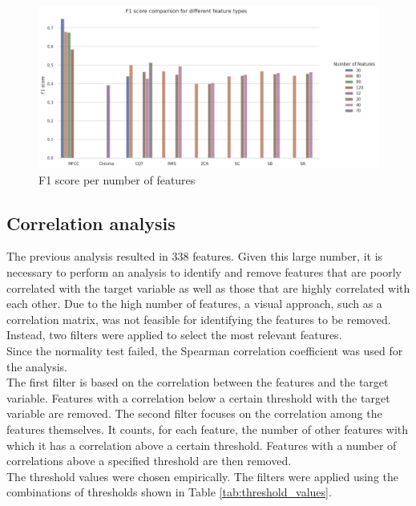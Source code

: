 \begin{figure}[htbp]
    \centering
    \includegraphics[width=.8\textwidth]{../images/n_feature_per_type.png}
    \caption{F1 score per number of features}
    \label{fig:n_feature_per_type}
\end{figure}
\noindent
\subsection{Correlation analysis}
The previous analysis resulted in 338 features. Given this large number, it is necessary to perform an analysis to identify and remove features
that are poorly correlated with the target variable as well as those that are highly correlated with each other.
Due to the high number of features, a visual approach, such as a correlation matrix, was not feasible for identifying the features to be removed.
Instead, two filters were applied to select the most relevant features.\\
Since the normality test failed, the Spearman correlation coefficient was used for the analysis.\\
The first filter is based on the correlation between the features and the target variable. Features with a correlation below a certain
threshold with the target variable are removed. The second filter focuses on the correlation among the features themselves.
It counts, for each feature, the number of other features with which it has a correlation above a certain threshold. Features with a
number of correlations above a specified threshold are then removed.\\
The threshold values were chosen empirically. The filters were applied using the combinations of thresholds shown in Table \ref{tab:threshold_values}.

